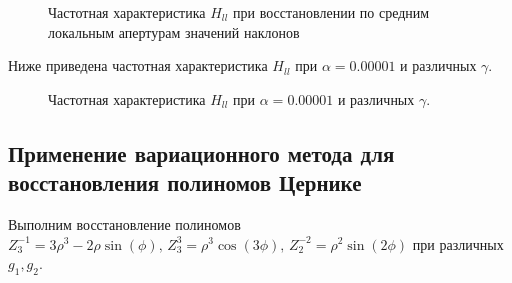 \documentclass{article}
\begin{document}
\begin{figure}[H]
\caption{Частотная характеристика $H_{ll}$ при восстановлении по средним локальным апертурам значений наклонов}
\end{figure}

Ниже приведена частотная характеристика $H_{ll}$ при $\alpha = 0.00001$ и различных $\gamma$.
\begin{figure}[H]
\caption{Частотная характеристика $H_{ll}$ при $\alpha = 0.00001$ и различных $\gamma$.}
\end{figure}


\subsection{Применение вариационного метода для восстановления полиномов Цернике}
Выполним восстановление полиномов $Z_3^{-1} = 3\rho^3 - 2\rho  \sin(\phi),\,Z_3^{3} = \rho^3  \cos(3\phi),\,Z_2^{-2} = \rho^2 \sin(2\phi)$ при различных $g_1, g_2$.
\end{document}
